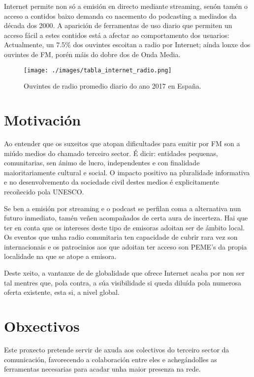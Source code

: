 Internet permite non só a emisión en directo mediante streaming, senón tamén o acceso a contidos baixo demanda co nacemento do podcasting a mediados da década dos 2000\cite{guardian}. A aparición de ferramentas de uso diario que permiten un acceso fácil a estes contidos está a afectar ao comportamento dos usuarios: Actualmente, un 7.5\% dos ouvintes escoitan a radio por Internet; aínda lonxe dos ouvintes de FM, porén máis do dobre dos de Onda Media\cite{EGM}.

\begin{figure}[H]
	\centering
	\texttt{[image: ./images/tabla\_internet\_radio.png]}
  	\caption{Ouvintes de radio promedio diario do ano 2017 en España.}
	\label{fig:table_egm}
\end{figure}

\section{Motivación}

Ao entender que os suxeitos que atopan dificultades para emitir por FM son a miúdo medios do chamado terceiro sector. É dicir: entidades pequenas, comunitarias, sen ánimo de lucro, independentes e con finalidade maioritariamente cultural e social\cite{fesp}. O impacto positivo na pluralidade informativa e no desenvolvemento da sociedade civil destes medios é explicitamente recoñecido pola UNESCO\cite{unesco}. 

Se ben a emisión por streaming e o podcast se perfilan coma a alternativa nun futuro inmediato, tamén veñen acompañados de certa aura de incerteza. Hai que ter en conta que os intereses deste tipo de emisoras adoitan ser de ámbito local. Os eventos que unha radio comunitaria ten capacidade de cubrir rara vez son internacionais e os patrocinios aos que adoitan ter acceso son PEME's da propia localidade na que se atope a emisora. 

Deste xeito, a vantanxe de de globalidade que ofrece Internet acaba por non ser tal mentres que, pola contra, a súa visibilidade si queda diluída pola numerosa oferta existente, esta si, a nivel global.



\section{Obxectivos}
\label{obxectivos}

Este proxecto pretende servir de axuda aos colectivos do terceiro sector da comunicación, favorecendo a colaboración entre eles e achegándolles as ferramentas necesarias para acadar unha maior presenza na rede.

